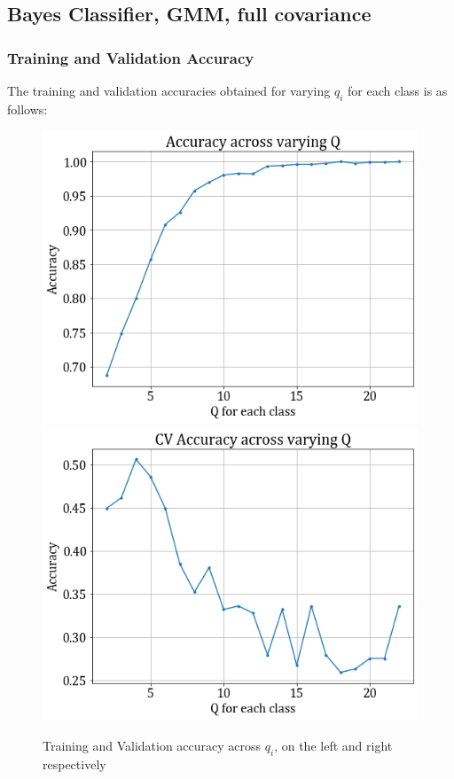\documentclass[11pt,a4paper]{article}
\begin{document}
\subsection{Bayes Classifier, GMM, full covariance}
\subsubsection{Training and Validation Accuracy}
The training and validation accuracies obtained for varying $q_i$ for each class is as follows:
\begin{figure}[H]
    \hspace{-2em}
    \includegraphics[scale=0.5]{images/2a_full_train_acc.png}
    \includegraphics[scale=0.5]{images/2a_full_val_acc.png}
    \caption{Training and Validation accuracy across $q_i$, on the left and right respectively}
\end{figure}
\end{document}
